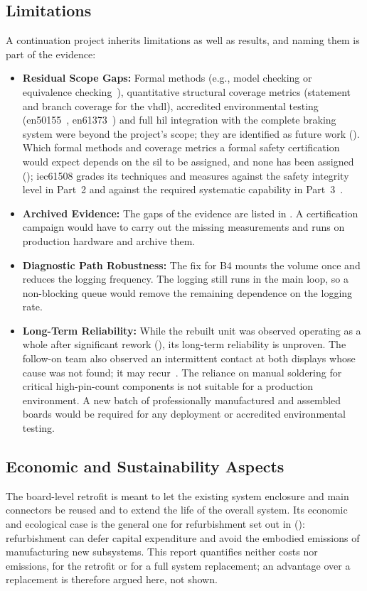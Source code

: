 \subsection{Limitations}
\label{subsec:limitations}
A continuation project inherits limitations as well as results, and naming them is part of the evidence:
\begin{itemize}
	\item \textbf{Residual Scope Gaps:} Formal methods (e.g., model checking or equivalence checking~\cite{formal_verification_rail_2023, mneimneh2005sequential}), quantitative structural coverage metrics (statement and branch coverage for the \gls{vhdl}), accredited environmental testing (\gls{en50155}~\cite{en50155_2021}, \gls{en61373}~\cite{en61373_2010}) and full \gls{hil} integration with the complete braking system were beyond the project's scope; they are identified as future work (). Which formal methods and coverage metrics a formal safety certification would expect depends on the \gls{sil} to be assigned, and none has been assigned (); \gls{iec61508} grades its techniques and measures against the safety integrity level in Part~2 and against the required systematic capability in Part~3~\cite{iec61508_2_2010, iec61508_3_2010}.
	\item \textbf{Archived Evidence:} The gaps of the evidence are listed in . A certification campaign would have to carry out the missing measurements and runs on production hardware and archive them.
	\item \textbf{Diagnostic Path Robustness:} The fix for B4 mounts the volume once and reduces the logging frequency. The logging still runs in the main loop, so a non-blocking queue would remove the remaining dependence on the logging rate.
	\item \textbf{Long-Term Reliability:} While the rebuilt unit was observed operating as a whole after significant rework (), its long-term reliability is unproven. The follow-on team also observed an intermittent contact at both displays whose cause was not found; it may recur~\cite[p.~13]{savchuk2025}. The reliance on manual soldering for critical high-pin-count components is not suitable for a production environment. A new batch of professionally manufactured and assembled boards would be required for any deployment or accredited environmental testing.
\end{itemize}

\subsection{Economic and Sustainability Aspects}
The board-level retrofit is meant to let the existing system enclosure and main connectors be reused and to extend the life of the overall system. Its economic and ecological case is the general one for refurbishment set out in  (): refurbishment can defer capital expenditure and avoid the embodied emissions of manufacturing new subsystems. This report quantifies neither costs nor emissions, for the retrofit or for a full system replacement; an advantage over a replacement is therefore argued here, not shown.

\flushbottom
